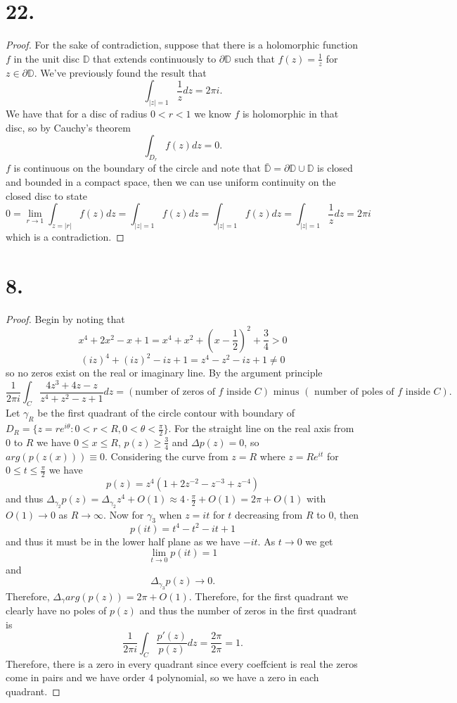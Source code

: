\documentclass{article}
\begin{document}
\section*{22.}
\begin{proof}
  For the sake of contradiction, suppose that there is a holomorphic function $f$ in the unit disc $\mathbb{D}$ that extends continuously to $\partial \mathbb{D}$ such that $f(z) = \frac{1}{z}$ for $z \in \partial \mathbb{D}$. We've previously found the result that 
  \[
  \int_{|z| = 1} \frac{1}{z} dz = 2 \pi i.   
  \] We have that for a disc of radius $0 < r < 1$ we know $f$ is holomorphic in that disc, so by Cauchy's theorem
  \[
  \int_{D_r}f(z)dz = 0. 
  \]
  $f$ is continuous on the boundary of the circle and note that $\bar{\mathbb{D}} = \partial \mathbb{D} \cup \mathbb{D}$ is closed and bounded in a compact space, then we can use uniform continuity on the closed disc to state
  \[
    0 = \lim\limits_{r \to 1}\int_{z = |r|} f(z)dz = \int_{|z| = 1}f(z) dz = \int_{|z| = 1} f(z) dz = \int_{|z| = 1} \frac{1}{z}dz = 2 \pi i
  \]
  which is a contradiction. 
\end{proof}

\section*{8.}
\begin{proof}
  Begin by noting that \[
  x^4 + 2x^2 - x + 1 = x^4 + x^2 + \left(x - \frac{1}{2}\right)^2 + \frac{3}{4} > 0  
  \]
  \[
  (iz)^4 + (iz)^2 -iz + 1 = z^4 - z^2 -iz + 1 \neq 0
  \]
  so no zeros exist on the real or imaginary line. By the argument principle
  \[
  \frac{1}{2 \pi i }\int_C \frac{4z^3 + 4z - z}{z^4 + z^2 -z + 1} dz = (\text{number of zeros of }f \text{ inside }C) \text{ minus } (\text{ number of poles of } f \text{ inside }C).
  \]
  Let $\gamma_R$ be the first quadrant of the circle contour with boundary of $D_R = \{z = re^{i \theta} : 0 < r < R, 0 < \theta < \frac{\pi}{2} \}$. For the straight line on the real axis from $0$ to $R$ we have $0 \leq x \leq R$, $p(z) \geq \frac{3}{4}$ and $\Delta p(z) = 0$, so $arg(p(z(x))) \equiv 0$. Considering the curve from $z = R$ where $z = Re^{it}$ for $0 \leq t \leq \frac{\pi}{2}$ we have 
  \[
  p(z) = z^4(1 + 2z^{-2} - z^{-3} + z^{-4})  
  \]
  and thus $\Delta_{\gamma_2}p(z) = \Delta_{\gamma_2}z^4 + O(1) \approx 4 \cdot \frac{\pi}{2} + O(1) = 2 \pi + O(1)$ with $O(1) \to 0$ as $R \to \infty$. Now for $\gamma_3$ when $z = it$ for $t$ decreasing from $R$ to $0$, then 
  \[
  p(it) = t^4 - t^2 -it + 1  
  \]
  and thus it must be in the lower half plane as we have $-it$. As $t \to 0$ we get 
  \[
  \lim\limits_{t \to 0} p(it) = 1   
  \]
  and 
  \[
  \Delta_{\gamma_3} p(z) \to 0.  
  \]
  Therefore, $\Delta_{\gamma}arg(p(z)) = 2 \pi + O(1)$. Therefore, for the first quadrant we clearly have no poles of $p(z)$ and thus 
  the number of zeros in the first quadrant is 
  \[
  \frac{1}{2 \pi i}\int_C \frac{p'(z)}{p(z)}dz = \frac{2 \pi }{2 \pi } = 1.  
  \]
  Therefore, there is a zero in every quadrant since every coeffcient is real the zeros come in pairs and we have order $4$ polynomial, so we have a zero in each quadrant. 
\end{proof}
\end{document}
